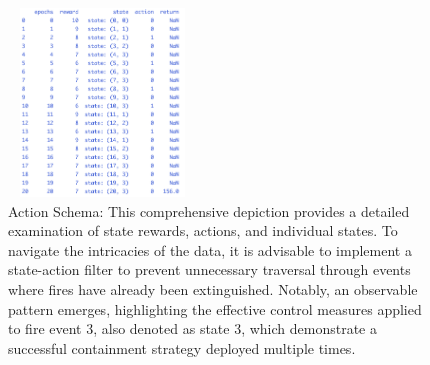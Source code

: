 \documentclass[lettersize,journal]{IEEEtran}
\begin{document}
      
        \begin{figure}
          \centering
          \includegraphics[height=5cm,width=5cm]{4_2000.png}
          \caption{Action Schema: This comprehensive depiction provides a detailed examination of state rewards, actions, and individual states. To navigate the intricacies of the data, it is advisable to implement a state-action filter to prevent unnecessary traversal through events where fires have already been extinguished. Notably, an observable pattern emerges, highlighting the effective control measures applied to fire event 3, also denoted as state 3, which demonstrate a successful containment strategy deployed multiple times.}\end{figure}
        
        
      
\end{document}
